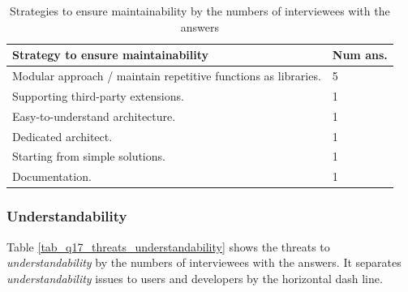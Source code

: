 \documentclass[preprint,12pt,authoryear]{elsarticle}
\begin{document}
\begin{table}[ht]
\centering
\begin{tabular}{ll}
\hline
Strategy to ensure maintainability & Num ans. \\ \hline
Modular approach / maintain repetitive functions as libraries. & 5 \\
Supporting third-party extensions. & 1 \\
Easy-to-understand architecture. & 1 \\
Dedicated architect. & 1 \\
Starting from simple solutions. & 1 \\
Documentation. & 1 \\ \hline
\end{tabular}
\caption{\label{tab_q16_strategies_maintainability}Strategies to ensure
maintainability by the numbers of interviewees with the answers}
\end{table}

\subsubsection{Understandability} \label{sec_interview_understandability}


Table \ref{tab_q17_threats_understandability} shows the threats to
\textit{understandability} by the numbers of interviewees with the answers. It
separates \textit{understandability} issues to users and developers by the
horizontal dash line.
\end{document}
